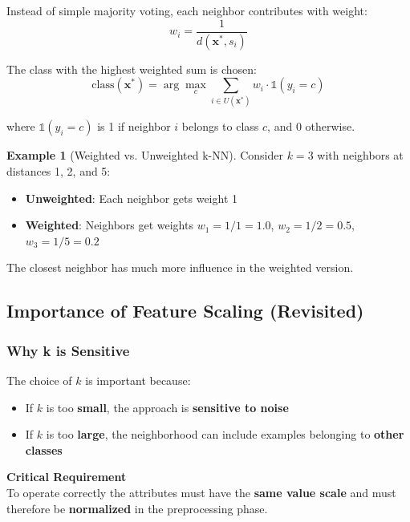\documentclass[11pt,a4paper]{article}
\theoremstyle{definition}
\newtheorem{example}{Example}[section]
\theoremstyle{plain}
\theoremstyle{remark}
\begin{document}
\begin{tcolorbox}[colback=green!5!white,colframe=green!75!black,title=\textbf{Weighted k-NN}]
Instead of simple majority voting, each neighbor contributes with weight:
\[
w_i = \frac{1}{d(\mathbf{x}^*, s_i)}
\]

The class with the highest weighted sum is chosen:
\[
\text{class}(\mathbf{x}^*) = \arg\max_c \sum_{i \in U(\mathbf{x}^*)} w_i \cdot \mathbb{1}(y_i = c)
\]

where $\mathbb{1}(y_i = c)$ is 1 if neighbor $i$ belongs to class $c$, and 0 otherwise.
\end{tcolorbox}

\begin{example}[Weighted vs. Unweighted k-NN]
Consider $k=3$ with neighbors at distances 1, 2, and 5:
\begin{itemize}
    \item \textbf{Unweighted}: Each neighbor gets weight 1
    \item \textbf{Weighted}: Neighbors get weights $w_1 = 1/1 = 1.0$, $w_2 = 1/2 = 0.5$, $w_3 = 1/5 = 0.2$
\end{itemize}
The closest neighbor has much more influence in the weighted version.
\end{example}

\subsection{Importance of Feature Scaling (Revisited)}

\subsubsection{Why k is Sensitive}

The choice of $k$ is important because:
\begin{itemize}
    \item If $k$ is too \textbf{small}, the approach is \textbf{sensitive to noise}
    \item If $k$ is too \textbf{large}, the neighborhood can include examples belonging to \textbf{other classes}
\end{itemize}

\begin{center}
\colorbox{yellow!20}{\parbox{0.9\textwidth}{
\textbf{Critical Requirement}\\[0.2cm]
To operate correctly the attributes must have the \textbf{same value scale} and must therefore be \textbf{normalized} in the preprocessing phase.
}}
\end{center}
\end{document}
